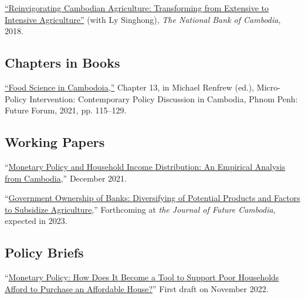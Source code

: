 \documentclass[10pt,a4paper]{article}
\begin{document}
	\href{https://ideas.repec.org/p/pra/mprapa/93086.html}{``Reinvigorating Cambodian Agriculture: Transforming from Extensive to Intensive Agriculture”} (with Ly Singhong), \textit{The National Bank of Cambodia}, 2018. \\ \vspace{-.5em}
			
\subsection*{Chapters in Books}

\href{https://kosalnith.github.io/research/policies/PolicyBrief-FST.pdf}{``Food Science in Cambodoia,''} Chapter 13, in Michael Renfrew (ed.), Micro-Policy Intervention: Contemporary Policy Discussion in Cambodia, Phnom Penh: Future Forum, 2021, pp. 115–129. 

\subsection*{Working Papers}

	“\href{https://kosalnith.github.io/research/papers/MPHI.pdf}{Monetary Policy and Household Income Distribution: An Empirical Analysis from Cambodia},” December 2021.\\ \vspace{-.5em}
	
	“\href{https://kosalnith.github.io/research/papers/GOB.pdf}{Government Ownership of Banks: Diversifying of Potential Products and Factors to Subsidize Agriculture},” Forthcoming at \textit{the Journal of Future Cambodia}, expected in 2023.

\subsection*{Policy Briefs}
	“\href{}{Monetary Policy: How Does It Become a Tool to Support Poor Households Afford to Purchase an Affordable House?}” First draft on November 2022. \\ \vspace{-.5em}
	
\end{document}
